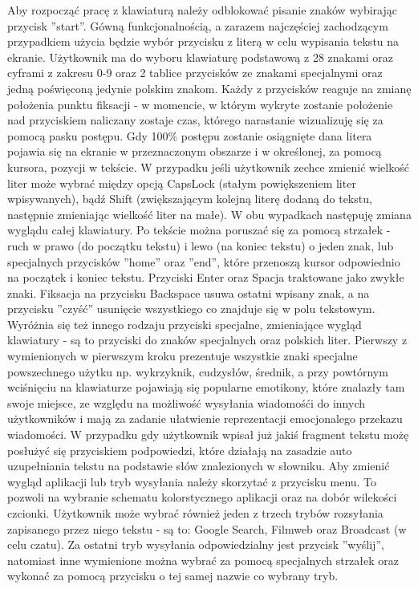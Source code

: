 \documentclass[twoside,a4paper]{book}
\begin{document}
Aby rozpocząć pracę z klawiaturą należy odblokować pisanie znaków wybirając przycisk ''start''.
Gówną funkcjonalnością, a zarazem najczęściej zachodzącym przypadkiem użycia będzie wybór przycisku z literą w celu wypisania tekstu na ekranie. Użytkownik ma do wyboru klawiaturę podstawową z 28 znakami oraz cyframi z zakresu 0-9 oraz 2 tablice przycisków ze znakami specjalnymi oraz jedną poświęconą jedynie polskim znakom. Każdy z przycisków reaguje na zmianę położenia punktu fiksacji - w momencie, w którym wykryte zostanie położenie nad przyciskiem naliczany zostaje czas, którego narastanie wizualizuję się za pomocą pasku postępu. Gdy 100\% postępu zostanie osiągnięte dana litera pojawia się na ekranie w przeznaczonym obszarze i w określonej, za pomocą kursora, pozycji w tekście. W przypadku jeśli użytkownik zechce zmienić wielkość liter może wybrać między opcją CapsLock (stałym powiększeniem liter wpisywanych), bądź Shift (zwiększającym kolejną literę dodaną do tekstu, następnie zmieniając wielkość liter na małe). W obu wypadkach następuję zmiana wyglądu całej klawiatury. 
Po tekście można poruszać się za pomocą strzałek - ruch w prawo (do początku tekstu) i lewo (na koniec tekstu) o jeden znak, lub specjalnych przycisków ''home'' oraz ''end'', które przenoszą kursor odpowiednio na początek i koniec tekstu. Przyciski Enter oraz Spacja traktowane jako zwykłe znaki. Fiksacja na przycisku Backspace usuwa ostatni wpisany znak, a   na przycisku ''czyść'' usunięcie wszystkiego co znajduje się w polu tekstowym. Wyróżnia się też innego rodzaju przyciski specjalne, zmieniające wygląd klawiatury - są to przyciski do znaków specjalnych oraz polskich liter. Pierwszy z wymienionych w pierwszym kroku prezentuje wszystkie znaki specjalne powszechnego użytku np. wykrzyknik, cudzysłów, średnik, a przy powtórnym wciśnięciu na klawiaturze pojawiają się popularne emotikony, które znalazły tam swoje miejsce, ze względu na możliwość wysyłania wiadomośći do innych użytkowników i mają za zadanie ułatwienie reprezentacji emocjonalego przekazu wiadomości. W przypadku gdy użytkownik wpisał już jakiś fragment tekstu możę posłużyć się przyciskiem podpowiedzi, które działają na zasadzie auto uzupełniania tekstu na podstawie słów znalezionych w słowniku. Aby zmienić wygląd aplikacji lub tryb wysyłania należy skorzytać z przycisku menu. To pozwoli na wybranie schematu kolorstycznego aplikacji oraz na dobór wilekości czcionki. Użytkownik może wybrać również jeden z trzech trybów rozsyłania zapisanego przez niego tekstu - są to: Google Search, Filmweb oraz Broadcast (w celu czatu). Za ostatni tryb wysyłania odpowiedzialny jest przycisk ''wyślij'', natomiast inne wymienione można wybrać za pomocą specjalnych strzałek oraz wykonać za pomocą przycisku o tej samej nazwie co wybrany tryb.
\end{document}
